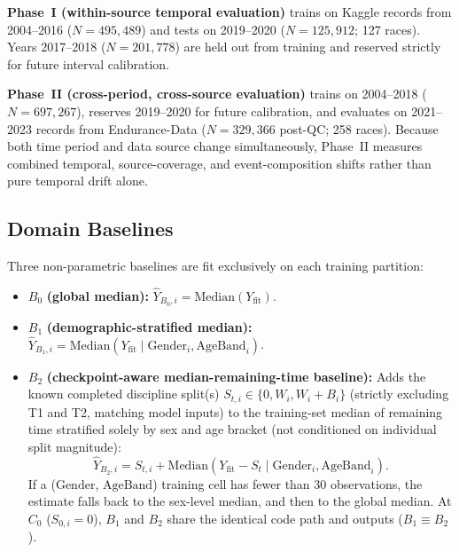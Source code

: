 \documentclass[11pt,a4paper]{article}
\begin{document}
\textbf{Phase~I (within-source temporal evaluation)} trains on Kaggle
records from 2004--2016 ($N = 495{,}489$) and tests on 2019--2020
($N = 125{,}912$; 127 races). Years 2017--2018 ($N = 201{,}778$) are
held out from training and reserved strictly for future interval
calibration.

\textbf{Phase~II (cross-period, cross-source evaluation)} trains on
2004--2018 ($N = 697{,}267$), reserves 2019--2020 for future
calibration, and evaluates on 2021--2023 records from Endurance-Data
($N = 329{,}366$ post-QC; 258 races). Because both time period and data
source change simultaneously, Phase~II measures combined temporal,
source-coverage, and event-composition shifts rather than pure
temporal drift alone.

\subsection{Domain Baselines}
\label{sec:baselines}

Three non-parametric baselines are fit exclusively on each training
partition:

\begin{itemize}[leftmargin=*]
  \item $B_0$ \textbf{(global median):}
  $\hat{Y}_{B_0,i} = \mathrm{Median}(Y_{\text{fit}})$.

  \item $B_1$ \textbf{(demographic-stratified median):}
  $\hat{Y}_{B_1,i} = \mathrm{Median}(Y_{\text{fit}} \mid
  \text{Gender}_i, \text{AgeBand}_i)$.

  \item $B_2$ \textbf{(checkpoint-aware median-remaining-time baseline):}
  Adds the known completed discipline split(s) $S_{t,i} \in \{0, W_i,
  W_i + B_i\}$ (strictly excluding T1 and T2, matching model inputs)
  to the training-set median of remaining time stratified solely by
  sex and age bracket (not conditioned on individual split magnitude):
  \begin{equation}
    \hat{Y}_{B_2,i} = S_{t,i}
    + \mathrm{Median}(Y_{\text{fit}} - S_t
    \mid \text{Gender}_i, \text{AgeBand}_i).
  \end{equation}
  If a ($\text{Gender}$, $\text{AgeBand}$) training cell has fewer
  than 30 observations, the estimate falls back to the sex-level
  median, and then to the global median. At $C_0$ ($S_{0,i} = 0$),
  $B_1$ and $B_2$ share the identical code path and outputs ($B_1 \equiv B_2$).
\end{itemize}
\end{document}
